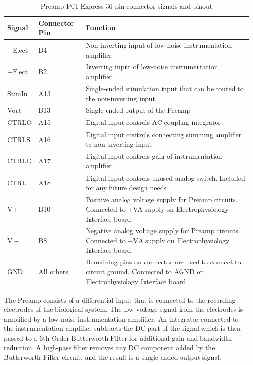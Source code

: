 \renewcommand{\arraystretch}{1.3}
\begin{table}[h]
\centering 
\begin{tabular}{|l|l|p{3.5in}|}
\hline
Signal	&	Connector Pin	& Function\\
\hline
+Elect	& B4	& Non-inverting input of low-noise instrumentation amplifier\\
\hline
$-\mathrm{Elect}$	& B2	& Inverting input of low-noise instrumentation amplifier\\
\hline
StimIn	& A13	& Single-ended stimulation input that can be routed to the non-inverting input\\
\hline
Vout	& B13	& Single-ended output of the Preamp\\
\hline
CTRLO	& A15	& Digital input controls AC coupling integrator\\
\hline
CTRLS	& A16	& Digital input controls connecting summing amplifier to non-inverting input\\
\hline
CTRLG	& A17	& Digital input controls gain of instrumentation amplifier\\
\hline
CTRL	& A18	& Digital input controls unused analog switch.  Included for any future design needs\\
\hline
V+	& B10	& Positive analog voltage supply for Preamp circuits.  Connected to +VA supply on Electrophysiology Interface board\\
\hline
$\mathrm{V}-$	& B8	& Negative analog voltage supply for Preamp circuits.  Connected to $-\mathrm{VA}$ supply on Electrophysiology Interface board\\
\hline
GND	& All others	& Remaining pins on connector are used to connect to circuit ground.  Connected to AGND on Electrophysiology Interface board \\
\hline
\end{tabular}
\caption{Preamp PCI-Express 36-pin connector signals and pinout\label{tab:PreampInt} }

\end{table}
\renewcommand{\arraystretch}{1.0}

The Preamp consists of a differential input that is connected to the recording electrodes of the biological system.  The low voltage signal from the electrodes is amplified by a low-noise instrumentation amplifier.  An integrator connected to the instrumentation amplifier subtracts the DC part of the signal which is then passed to a 6th Order Butterworth Filter for additional gain and bandwidth reduction.  A high-pass filter removes any DC component added by the Butterworth Filter circuit, and the result is a single ended output signal.

